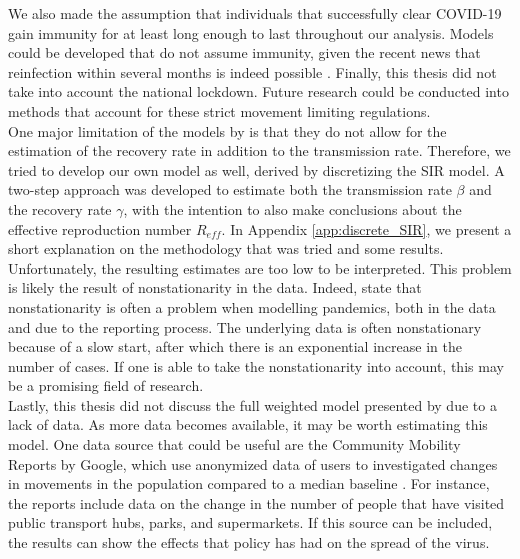 \documentclass[12pt]{article}
\begin{document}
	We also made the assumption that individuals that successfully clear COVID-19 gain immunity for at least long enough to last throughout our analysis. Models could be developed that do not assume immunity, given the recent news that reinfection within several months is indeed possible \parencite{bloomberg2020reinfection}. Finally, this thesis did not take into account the national lockdown. %
	Future research could be conducted into methods that account for these strict movement limiting regulations.
	\\
	
	One major limitation of the models by \textcite{adda2016economic} is that they do not allow for the estimation of the recovery rate in addition to the transmission rate. Therefore, we tried to develop our own model as well, derived by discretizing the SIR model. A two-step approach was developed to estimate both the transmission rate $\beta$ and the recovery rate $\gamma$, with the intention to also make conclusions about the effective reproduction number $R_{eff}$. In Appendix \ref{app:discrete_SIR}, we present a short explanation on the methodology that was tried and some results. Unfortunately, the resulting estimates are too low to be interpreted. This problem is likely the result of nonstationarity in the data. Indeed, \textcite{castle2020nonstationarity} state that nonstationarity is often a problem when modelling pandemics, both in the data and due to the reporting process. The underlying data is often nonstationary because of a slow start, after which there is an exponential increase in the number of cases. %
	If one is able to take the nonstationarity into account, this may be a promising field of research. \\
	
	Lastly, this thesis did not discuss the full weighted model presented by \textcite{adda2016economic} due to a lack of data. As more data becomes available, it may be worth estimating this model. One data source that could be useful are the Community Mobility Reports by Google, which use anonymized data of users to investigated changes in movements in the population compared to a median baseline \parencite{google_mobility_report}. For instance, the reports include data on the change in the number of people that have visited public transport hubs, parks, and supermarkets. If this source can be included, the results can show the effects that policy has had on the spread of the virus.
	
\end{document}

